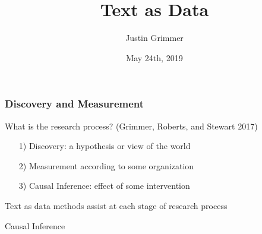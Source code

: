 \documentclass[xcolor=dvipsnames]{beamer}
\title[Text as Data] %
{Text as Data}
\author{Justin Grimmer}
\institute[Stanford University]{Professor\\Department of Political Science \\  Stanford University}
\date{May 24th, 2019}%
\begin{document}
\begin{frame}
\titlepage
\end{frame}



\begin{frame}
\frametitle{Discovery and Measurement}

What is the research process? (Grimmer, Roberts, and Stewart 2017)

\begin{itemize}
  \item[1)] \alert{Discovery}: a hypothesis or view of the world
  \item[2)] \alert{Measurement} according to some organization
  \item[3)] \alert{Causal Inference}: effect of some intervention
\end{itemize}

Text as data methods assist at each stage of research process

\end{frame}



\begin{frame}

\huge

Causal Inference

\end{frame}
\end{document}
